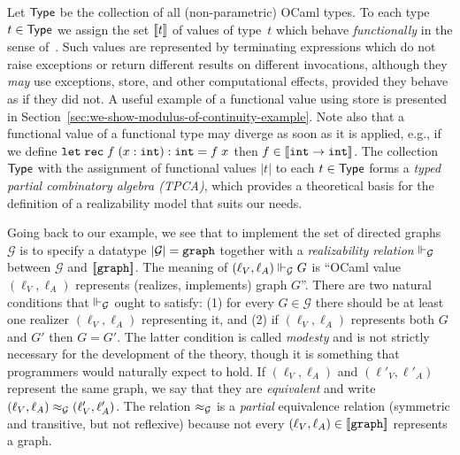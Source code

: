 Let $\mathsf{Type}$ be the collection of all (non-parametric) OCaml types. To
each type $t \in \mathsf{Type}$ we assign the set $[\![t]\!]$ of values of
type~$t$ which behave \emph{functionally} in the sense
of~\cite{longley99when}. Such values are represented by terminating
expressions which do not raise exceptions or return different results
on different invocations, although they \emph{may} use exceptions,
store, and other computational effects, provided they behave as if
they did not. A useful example of a functional value using store is
presented in Section~\ref{sec:we-show-modulus-of-continuity-example}.
Note also that a functional value of a functional type may diverge as
soon as it is applied, e.g., if we define
$\mathtt{let}\;\mathtt{rec}\;f\;(x:\mathtt{int}):\mathtt{int} = f\;x$ then $f \in [\![\mathtt{int} \to
  \mathtt{int}]\!]$. The collection $\mathsf{Type}$ with the assignment of functional
values $|t|$ to each $t \in \mathsf{Type}$ forms a \emph{typed partial
  combinatory algebra (TPCA)}, which provides a theoretical basis for
the definition of a realizability model that suits our needs.

Going back to our example, we see that to implement the set of
directed graphs $\mathcal{G}$ is to specify a datatype
$|\mathcal{G}| = \mathtt{graph}$ together with a
\emph{realizability relation} $\Vdash_{\mathcal{G}}$ between
$\mathcal{G}$ and $[\![\mathtt{graph}]\!]$. The meaning of $(\ell_V,
\ell_A) \Vdash_\mathcal{G} G$ is ``OCaml value $(\ell_V, \ell_A)$ represents
(realizes, implements) graph $G$''. There are two natural conditions
that $\Vdash_\mathcal{G}$ ought to satisfy: (1) for every $G \in
\mathcal{G}$ there should be at least one realizer $(\ell_V, \ell_A)$
representing it, and (2) if $(\ell_V, \ell_A)$ represents both $G$ and
$G'$ then $G = G'$. The latter condition is called \emph{modesty} and
is not strictly necessary for the development of the theory, though it
is something that programmers would naturally expect to hold. If
$(\ell_V, \ell_A)$ and $(\ell'_V, \ell'_A)$ represent the same graph,
we say that they are \emph{equivalent} and write $(\ell_V, \ell_A)
\approx_\mathcal{G} (\ell'_V, \ell'_A)$. The relation $\approx_\mathcal{G}$
is a \emph{partial} equivalence relation (symmetric and transitive,
but not reflexive) because not every $(\ell_V, \ell_A) \in
[\![\mathtt{graph}]\!]$ represents a graph.

\bigskip

